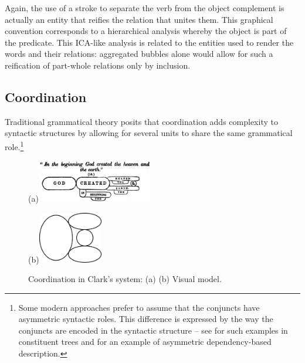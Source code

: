 \documentclass[output=paper]{langsci/langscibook}
\begin{document}
Again, the use of a stroke to separate the verb from the object complement is actually an entity that reifies the relation that unites them. This graphical convention corresponds to a hierarchical analysis whereby the object is part of the predicate. This ICA-like analysis is related to the entities used to render the words and their relations: aggregated bubbles alone would allow for such a reification of part-whole relations only by inclusion.

\subsection{Coordination}

Traditional grammatical theory posits that coordination adds complexity to syntactic structures by allowing for several units to share the same grammatical role.\footnote{\textrm{Some modern approaches prefer to assume that the conjuncts have asymmetric syntactic roles. This difference is expressed by the way the conjuncts are encoded in the syntactic structure – see \citet{mouret_grammaire_2007} for such examples in constituent trees and \citet[50-51]{polguere_dependency_2009} for an example of asymmetric dependency-based description.}} 

\begin{figure}
    
    \centering
    (a)\includegraphics[width=0.45\textwidth]{figures/04/Kap.4.img.0007a.jpg}
    
    (b)\includegraphics[width=0.25\textwidth]{figures/04/Kap.4.img.0007b.jpg.png}
    
    \caption{Coordination in Clark’s system: (a) \citet[24]{clark_science_1847} (b) Visual model.}
    \label{fig:7}
    
\end{figure}
 
\end{document}

